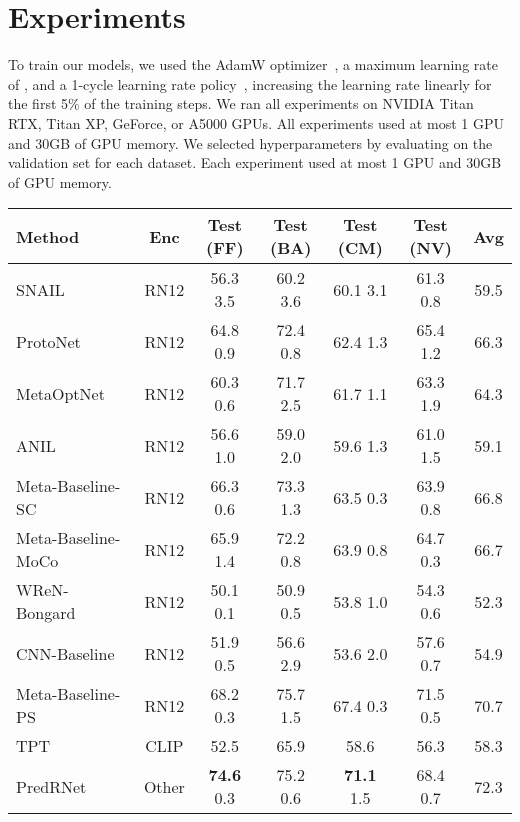 
\section{Experiments}\label{sec:exp}

To train our models, we used the AdamW optimizer~\cite{loshchilov2017decoupled}, a maximum learning rate of , and a 1-cycle learning rate policy~\cite{smith2019super}, increasing the learning rate linearly for the first 5\% of the training steps.
We ran all experiments on NVIDIA Titan RTX, Titan XP, GeForce, or A5000 GPUs. All experiments used at most 1 GPU and 30GB of GPU memory.
We selected hyperparameters by evaluating on the validation set for each dataset.
Each experiment used at most 1 GPU and 30GB of GPU memory.



\begin{table*}
  \centering
    \begin{tabular}{lcccccc}
    \toprule
    Method & Enc & Test (FF) & Test (BA) & Test (CM) & Test (NV) & Avg \\
    \midrule
    SNAIL~\cite{mishra2018simple} & RN12 & 56.3  3.5& 60.2  3.6 & 60.1  3.1 & 61.3  0.8 & 59.5 \\
    ProtoNet~\cite{snell2017prototypical} & RN12 & 64.8  0.9 &72.4  0.8  & 62.4  1.3 & 65.4  1.2  &  66.3 \\
    MetaOptNet~\cite{lee2019meta} & RN12 &60.3  0.6 & 71.7  2.5 & 61.7  1.1 & 63.3  1.9  &  64.3 \\
    ANIL~\cite{raghu2020rapid} & RN12 & 56.6  1.0 & 59.0  2.0 & 59.6  1.3 & 61.0  1.5  &  59.1 \\
    Meta-Baseline-SC~\cite{chen2020new} & RN12 &66.3  0.6 & 73.3  1.3 & 63.5  0.3 & 63.9  0.8  &  66.8 \\
    Meta-Baseline-MoCo~\cite{nie2021bongardlogo} & RN12 &65.9  1.4 & 72.2  0.8 & 63.9  0.8 & 64.7  0.3  & 66.7  \\
    WReN-Bongard~\cite{barrett2018measuring} & RN12 &50.1  0.1 & 50.9  0.5 & 53.8  1.0 & 54.3  0.6  &  52.3 \\
    CNN-Baseline~\cite{nie2021bongardlogo} & RN12 &51.9  0.5 & 56.6  2.9 & 53.6  2.0 & 57.6  0.7  &  54.9 \\
    Meta-Baseline-PS~\cite{nie2021bongardlogo} & RN12 & 68.2  0.3 & 75.7  1.5 & 67.4  0.3 & 71.5  0.5 & 70.7 \\ 
    TPT~\cite{shu2022testtime} & CLIP &52.5 & 65.9 & 58.6 & 56.3  &  58.3\\
    PredRNet~\cite{yang2023neural} & Other & \textbf{74.6}  0.3 & 75.2  0.6 & \textbf{71.1}  1.5 & 68.4  0.7 &  72.3 \\

\end{tabular}
\end{table*}
